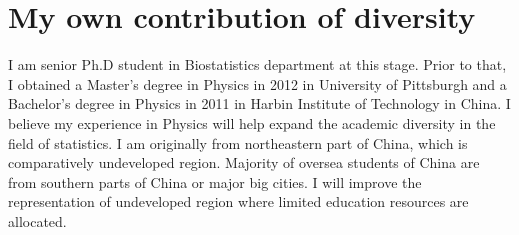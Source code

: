 \documentclass[12pt]{amsart} \usepackage{amssymb}
\begin{document}
\section{My own contribution of diversity}
I am senior Ph.D student in Biostatistics department at this stage.
Prior to that, I obtained a Master's degree in Physics in 2012 in University of Pittsburgh 
and a Bachelor's degree in Physics in 2011 in Harbin Institute of Technology in China.
I believe my experience in Physics will help expand the academic diversity in the field of statistics.
I am originally from northeastern part of China, which is comparatively undeveloped region.
Majority of oversea students of China are from southern parts of China or major big cities.
I will improve the representation of undeveloped region where limited education resources are allocated.
\end{document}
